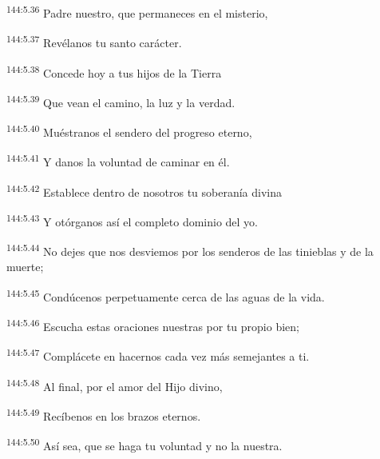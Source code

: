 \begin{center}
\par
\textsuperscript{144:5.36} Padre nuestro, que permaneces en el misterio,

\par
\textsuperscript{144:5.37} Revélanos tu santo carácter.

\par
\textsuperscript{144:5.38} Concede hoy a tus hijos de la Tierra

\par
\textsuperscript{144:5.39} Que vean el camino, la luz y la verdad.

\par
\textsuperscript{144:5.40} Muéstranos el sendero del progreso eterno,

\par
\textsuperscript{144:5.41} Y danos la voluntad de caminar en él.

\par
\textsuperscript{144:5.42} Establece dentro de nosotros tu soberanía divina

\par
\textsuperscript{144:5.43} Y otórganos así el completo dominio del yo.

\par
\textsuperscript{144:5.44} No dejes que nos desviemos por los senderos de las tinieblas y de la muerte;

\par
\textsuperscript{144:5.45} Condúcenos perpetuamente cerca de las aguas de la vida.

\par
\textsuperscript{144:5.46} Escucha estas oraciones nuestras por tu propio bien;

\par
\textsuperscript{144:5.47} Complácete en hacernos cada vez más semejantes a ti.

\par
\textsuperscript{144:5.48} Al final, por el amor del Hijo divino,

\par
\textsuperscript{144:5.49} Recíbenos en los brazos eternos.

\par
\textsuperscript{144:5.50} Así sea, que se haga tu voluntad y no la nuestra.
\end{center}

